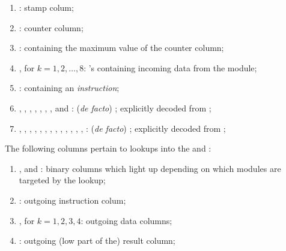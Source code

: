 \begin{enumerate}
	\item \oobStamp{}:
		stamp colum;
	\item \ct{}:
		counter column;
	\item \maxCt{}:
		\ccc{} containing the maximum value of the counter column;
	\item {}, for $k = 1, 2, \dots, 8$: \godGiven{}
		\ccc{}'s containing incoming data from the \hubMod{} module;
	\item \oobInstruction{}: \godGiven{}
		\ccc{} containing an \emph{\oobMod{} instruction};
	\item
		\oobInstIsJump{},
		\oobInstIsJumpI{},
		\oobInstIsRdc{},
		\oobInstIsCdl{},
		\oobInstIsXcall{},
		\oobInstIsCall{},
		\oobInstIsCreate{},
		\oobInstIsSstore{} and 
		\oobInstIsDeployment{}:
		(\emph{de facto}) \ccbc{}; explicitly decoded from \oobInst{};
	\item 
		\oobInstIsEcrecover{},
		\oobInstIsShaTwo{},
		\oobInstIsRipemd{},
		\oobInstIsIdentity{},
		\oobInstIsEcadd{},
		\oobInstIsEcmul{},
		\oobInstIsEcpairing{},
		\oobInstIsBlakeCds{},
		\oobInstIsBlakeParams{},
		\oobInstIsModexpCds{},
		\oobInstIsModexpXbs{},
		\oobInstIsModexpLead{},
		\oobInstIsModexpPricing{},
		\oobInstIsModexpExtract{}:
		(\emph{de facto}) \ccbc{}; explicitly decoded from \oobInstruction{};
\end{enumerate}
The following columns pertain to lookups into the \wcpMod{} and \addMod{}: 
\begin{enumerate}[resume]
	\item \wcpFlag{}, \addFlag{} and \modFlag{}:
		binary columns which light up depending on which modules are targeted by the lookup;
	\item \outgoingInst{}:
		outgoing instruction colum;
	\item {}, for $k = 1, 2, 3, 4$:
		outgoing data columns;
	\item \outgoingResLo{}:
		outgoing (low part of the) result column;
\end{enumerate}
